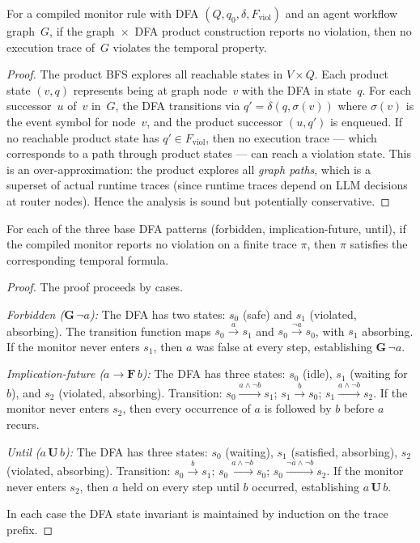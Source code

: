 \begin{lemma}
\label{lem:static_temporal}
For a compiled monitor rule with DFA $(Q, q_0, \delta, F_{\mathrm{viol}})$
and an agent workflow graph~$G$, if the graph~$\times$~DFA product
construction reports no violation, then no execution trace of~$G$
violates the temporal property.
\end{lemma}
\begin{proof}
The product BFS explores all reachable states in
$V \times Q$.  Each product state $(v, q)$ represents being at graph
node~$v$ with the DFA in state~$q$.  For each successor~$u$ of~$v$ in~$G$,
the DFA transitions via $q' = \delta(q, \sigma(v))$ where $\sigma(v)$ is the
event symbol for node~$v$, and the product successor $(u, q')$ is enqueued.
If no reachable product state has $q' \in F_{\mathrm{viol}}$, then no
execution trace --- which corresponds to a path through product states ---
can reach a violation state.  This is an over-approximation: the product
explores all \emph{graph paths}, which is a superset of actual runtime traces
(since runtime traces depend on LLM decisions at router nodes).  Hence the
analysis is sound but potentially conservative.
\end{proof}

\begin{lemma}
\label{lem:monitor}
For each of the three base DFA patterns (forbidden, implication-future,
until), if the compiled monitor reports no violation on a finite trace
$\pi$, then $\pi$ satisfies the corresponding temporal formula.
\end{lemma}
\begin{proof}
The proof proceeds by cases.

\emph{Forbidden ($\mathbf{G}\,\neg a$):} The DFA has two states:
$s_0$ (safe) and $s_1$ (violated, absorbing). The transition
function maps $s_0 \xrightarrow{a} s_1$ and
$s_0 \xrightarrow{\neg a} s_0$, with $s_1$ absorbing.
If the monitor never enters $s_1$, then $a$ was false at every step,
establishing $\mathbf{G}\,\neg a$.

\emph{Implication-future ($a \to \mathbf{F}\,b$):} The DFA has three
states: $s_0$ (idle), $s_1$ (waiting for $b$), and $s_2$ (violated,
absorbing). Transition: $s_0 \xrightarrow{a \wedge \neg b} s_1$;
$s_1 \xrightarrow{b} s_0$; $s_1 \xrightarrow{a \wedge \neg b} s_2$.
If the monitor never enters $s_2$, then every occurrence of $a$ is
followed by $b$ before $a$ recurs.

\emph{Until ($a\,\mathbf{U}\,b$):} The DFA has three states: $s_0$
(waiting), $s_1$ (satisfied, absorbing), $s_2$ (violated, absorbing).
Transition: $s_0 \xrightarrow{b} s_1$;
$s_0 \xrightarrow{a \wedge \neg b} s_0$;
$s_0 \xrightarrow{\neg a \wedge \neg b} s_2$.
If the monitor never enters $s_2$, then $a$ held on every step until
$b$ occurred, establishing $a\,\mathbf{U}\,b$.

In each case the DFA state invariant is maintained by induction on
the trace prefix.
\end{proof}
